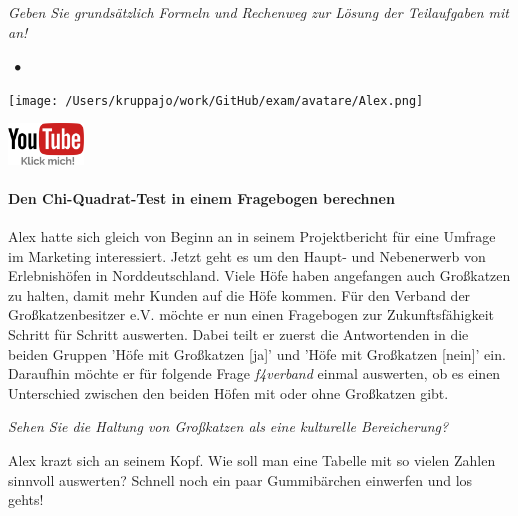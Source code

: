 \documentclass[a4paper, 9pt]{scrartcl}\usepackage[]{graphicx}\usepackage[]{xcolor}
\begin{document}
\textit{Geben Sie grundsätzlich Formeln und Rechenweg zur Lösung der Teilaufgaben mit an!} \\[1Ex]
 

 
\ifcollection
\begin{flushright}
\tiny\vspace{-3Ex}
\textbf{\examinhaltstart}
\exammodulestat $\;\bullet$
\exammodulestatbbv 
\vspace{-4Ex}
\end{flushright}
\begin{minipage}[t]{0.5\textwidth}
\texttt{[image: /Users/kruppajo/work/GitHub/exam/avatare/Alex.png]}
\end{minipage}
\begin{minipage}[t]{0.5\textwidth}
\hfill
\href{https://youtu.be/LzAAdJPH4ZU}{\includegraphics[width = 2cm]{img/youtube}}
\end{minipage}
\vspace{-3Ex}
\fi



\ifcollection
\paragraph{Den Chi-Quadrat-Test in einem Fragebogen berechnen}
\fi

Alex hatte sich gleich von Beginn an in seinem Projektbericht für eine Umfrage im Marketing interessiert. Jetzt geht es um den Haupt- und Nebenerwerb von Erlebnishöfen in Norddeutschland. Viele Höfe haben angefangen auch Großkatzen zu halten, damit mehr Kunden auf die Höfe kommen. Für den Verband der Großkatzenbesitzer e.V. möchte er nun einen Fragebogen zur Zukunftsfähigkeit Schritt für Schritt auswerten. Dabei teilt er zuerst die Antwortenden in die beiden Gruppen 'Höfe mit Großkatzen [ja]' und 'Höfe mit Großkatzen [nein]' ein. Daraufhin möchte er für folgende Frage \textit{f4verband} einmal auswerten, ob es einen Unterschied zwischen den beiden Höfen mit oder ohne Großkatzen gibt. \begin{center}\textit{Sehen Sie die Haltung von Großkatzen als eine kulturelle Bereicherung?}\end{center}Alex krazt sich an seinem Kopf. Wie soll man eine Tabelle mit so vielen Zahlen sinnvoll auswerten? Schnell noch ein paar Gummibärchen einwerfen und los gehts!
\end{document}
